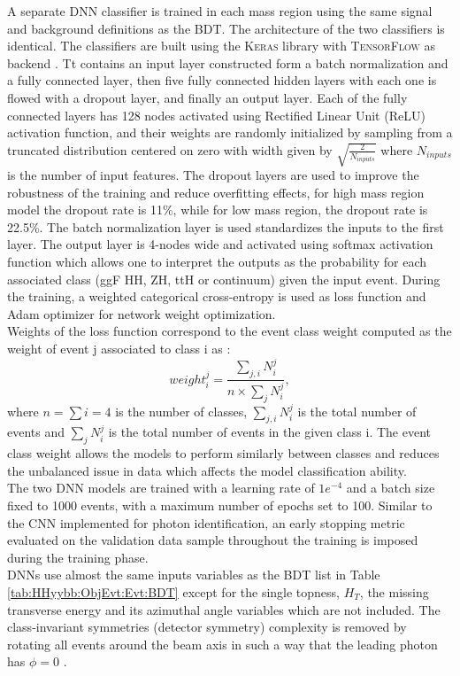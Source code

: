 A separate DNN classifier is trained in each mass region using the same signal and background definitions as the BDT. The architecture of the two classifiers is identical. The classifiers are built using the \textsc{Keras} library with \textsc{TensorFlow} as backend \cite{keras,tensorflow}. Tt contains an input layer constructed form a batch normalization and a fully connected layer, then five fully connected hidden layers with each one is flowed with a dropout layer, and finally an output layer. Each of the fully connected layers has 128 nodes activated using Rectified Linear Unit (ReLU) activation function, and their weights are randomly initialized by sampling from a truncated distribution centered on zero with width given by $\sqrt{\frac{2}{N_{inputs}}}$ where $N_{inputs}$ is the number of input features. The dropout layers are used to improve the robustness of the training and reduce overfitting effects, for high mass region model the dropout rate is 11\%, while for low mass region, the dropout rate is 22.5\%. The batch normalization layer is used standardizes the inputs to the first layer. The output layer is 4-nodes wide and activated using softmax activation function which allows one to interpret the outputs as the probability for each associated class (ggF HH, ZH, ttH or continuum) given the input event. During the training, a weighted categorical cross-entropy is used as loss function and Adam optimizer for network weight optimization.\\
Weights of the loss function correspond to the event class weight computed as the weight of event j associated to class i as :
\begin{equation}
    weight_i^j = \frac{\sum_{j,i} N_i^j}{n\times\sum_{j} N_i^j},
\end{equation}
where $n=\sum i = 4$ is the number of classes, $\sum_{j,i} N_i^j$ is the total number of events and $\sum_{j} N_i^j$ is the total number of events in the given class i. The event class weight allows the models to perform similarly between classes and reduces the unbalanced issue in data which affects the model classification ability.\\
The two DNN models are trained with a learning rate of $1e^{-4}$ and a batch size fixed to 1000 events, with a maximum number of epochs set to 100. Similar to the CNN implemented for photon identification, an early stopping metric evaluated on the validation data sample throughout the training is imposed during the training phase.\\ 
DNNs use almost the same inputs variables as the BDT list in Table \ref{tab:HHyybb:ObjEvt:Evt:BDT} except for the single topness, $H_T$, the missing transverse energy and its azimuthal angle variables which are not included. The class-invariant symmetries (detector symmetry) complexity is removed by rotating all events around the beam axis in such a way that the leading photon has $\phi=0$ . \\
